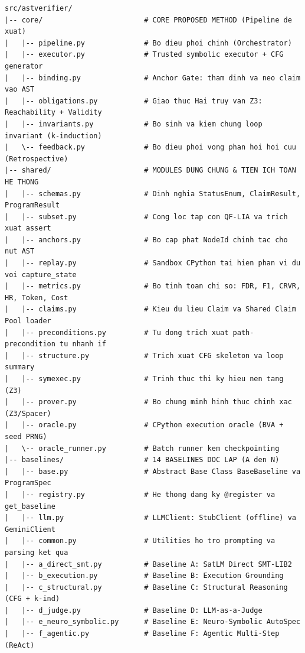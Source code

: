 \begin{center}
\begin{minipage}{0.96\textwidth}
\begin{verbatim}
src/astverifier/
|-- core/                        # CORE PROPOSED METHOD (Pipeline de xuat)
|   |-- pipeline.py              # Bo dieu phoi chinh (Orchestrator)
|   |-- executor.py              # Trusted symbolic executor + CFG generator
|   |-- binding.py               # Anchor Gate: tham dinh va neo claim vao AST
|   |-- obligations.py           # Giao thuc Hai truy van Z3: Reachability + Validity
|   |-- invariants.py            # Bo sinh va kiem chung loop invariant (k-induction)
|   \-- feedback.py              # Bo dieu phoi vong phan hoi hoi cuu (Retrospective)
|-- shared/                      # MODULES DUNG CHUNG & TIEN ICH TOAN HE THONG
|   |-- schemas.py               # Dinh nghia StatusEnum, ClaimResult, ProgramResult
|   |-- subset.py                # Cong loc tap con QF-LIA va trich xuat assert
|   |-- anchors.py               # Bo cap phat NodeId chinh tac cho nut AST
|   |-- replay.py                # Sandbox CPython tai hien phan vi du voi capture_state
|   |-- metrics.py               # Bo tinh toan chi so: FDR, F1, CRVR, HR, Token, Cost
|   |-- claims.py                # Kieu du lieu Claim va Shared Claim Pool loader
|   |-- preconditions.py         # Tu dong trich xuat path-precondition tu nhanh if
|   |-- structure.py             # Trich xuat CFG skeleton va loop summary
|   |-- symexec.py               # Trinh thuc thi ky hieu nen tang (Z3)
|   |-- prover.py                # Bo chung minh hinh thuc chinh xac (Z3/Spacer)
|   |-- oracle.py                # CPython execution oracle (BVA + seed PRNG)
|   \-- oracle_runner.py         # Batch runner kem checkpointing
|-- baselines/                   # 14 BASELINES DOC LAP (A den N)
|   |-- base.py                  # Abstract Base Class BaseBaseline va ProgramSpec
|   |-- registry.py              # He thong dang ky @register va get_baseline
|   |-- llm.py                   # LLMClient: StubClient (offline) va GeminiClient
|   |-- common.py                # Utilities ho tro prompting va parsing ket qua
|   |-- a_direct_smt.py          # Baseline A: SatLM Direct SMT-LIB2
|   |-- b_execution.py           # Baseline B: Execution Grounding
|   |-- c_structural.py          # Baseline C: Structural Reasoning (CFG + k-ind)
|   |-- d_judge.py               # Baseline D: LLM-as-a-Judge
|   |-- e_neuro_symbolic.py      # Baseline E: Neuro-Symbolic AutoSpec
|   |-- f_agentic.py             # Baseline F: Agentic Multi-Step (ReAct)

\end{verbatim}
\end{minipage}
\end{center}
